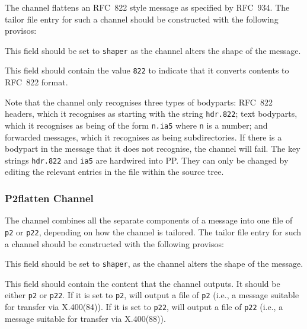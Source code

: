 The  channel flattens an RFC~822 style message as
specified by RFC~934.  The tailor file entry for such a channel should
be constructed with the following provisos:
\begin{describe}

\item[\verb+type+:] This field should be set to \verb+shaper+ as the
channel alters the shape of the message.

\item[\verb+content-out+:] This field should contain the value
\verb+822+ to indicate that it converts contents to RFC~822 format.
\end{describe}
Note that the  channel only recognises three types of
bodyparts: RFC~822 headers, which it recognises as starting with the
string \verb+hdr.822+; text bodyparts, which it recognises as being of
the form \verb+n.ia5+ where \verb+n+ is a number; and forwarded
messages, which it recognises as being subdirectories.
If there is a bodypart in the message that it does not recognise, the
 channel will fail.
The key strings \verb+hdr.822+ and \verb+ia5+ are hardwired into PP.
They can only be changed by editing the relevant entries in the file
 within the source tree.

\subsubsection	{P2flatten Channel}

The  channel combines all the separate components of a
message into one file of \verb+p2+ or \verb+p22+, depending on how the
channel is tailored.  The tailor file entry for such a channel should
be constructed with the following provisos:
\begin{describe}

\item[\verb+type+:] This field should be set to \verb+shaper+, as the
channel alters the shape of the message.

\item[\verb+content-out+:] This field should contain the content
that the channel outputs. 
It should be either \verb+p2+ or \verb+p22+.
If it is set to \verb+p2+,  will output a file of \verb+p2+
(i.e., a message suitable for transfer via X.400(84)).
If it is set to \verb+p22+,  will output a file of
\verb+p22+ (i.e., a message suitable for transfer via X.400(88)).

\end{describe}

